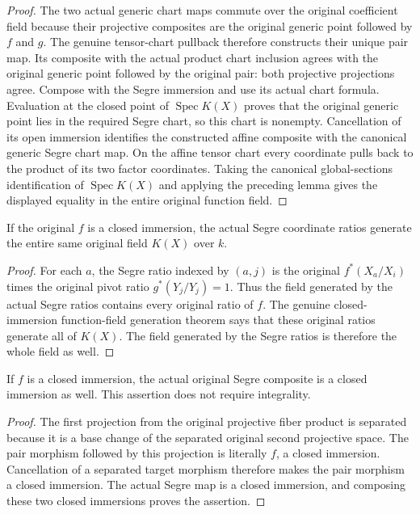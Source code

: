 \begin{proof}
The two actual generic chart maps commute over the original coefficient
field because their projective composites are the original generic point
followed by $f$ and $g$. The genuine tensor-chart pullback therefore
constructs their unique pair map. Its composite with the actual product
chart inclusion agrees with the original generic point followed by the
original pair: both projective projections agree. Compose with the Segre
immersion and use its actual chart formula. Evaluation at the closed point
of $\operatorname{Spec}K(X)$ proves that the original generic point lies
in the required Segre chart, so this chart is nonempty. Cancellation of
its open immersion identifies the constructed affine composite with the
canonical generic Segre chart map. On the affine tensor chart every
coordinate pulls back to the product of its two factor coordinates.
Taking the canonical global-sections identification of $\operatorname{Spec}K(X)$
and applying the preceding lemma gives the displayed equality in the
entire original function field.
\end{proof}
\begin{theorem}
\label{thm:segre-native-entire-function-field}
\leanok
{}
If the original $f$ is a closed immersion, the actual Segre coordinate
ratios generate the entire same original field $K(X)$ over $k$.
\end{theorem}
\begin{proof}
For each $a$, the Segre ratio indexed by $(a,j)$ is the original
$f^*(X_a/X_i)$ times the original pivot ratio $g^*(Y_j/Y_j)=1$.
Thus the field generated by the actual Segre ratios contains every
original ratio of $f$. The genuine closed-immersion function-field
generation theorem says that these original ratios generate all of
$K(X)$. The field generated by the Segre ratios is therefore the whole
field as well.
\end{proof}
\begin{theorem}
\label{thm:original-segre-composite-closed-embedding}
\leanok
{}
If $f$ is a closed immersion, the actual original Segre composite is a
closed immersion as well. This assertion does not require integrality.
\end{theorem}
\begin{proof}
The first projection from the original projective fiber product is
separated because it is a base change of the separated original second
projective space. The pair morphism followed by this projection is
literally $f$, a closed immersion. Cancellation of a separated target
morphism therefore makes the pair morphism a closed immersion. The
actual Segre map is a closed immersion, and composing these two closed
immersions proves the assertion.
\end{proof}
